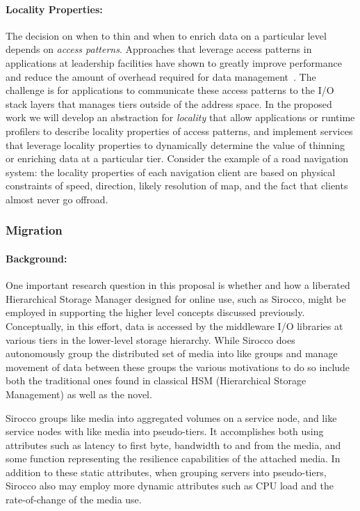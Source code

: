 \paragraph{Locality Properties:} The decision on when to thin and when to
enrich data on a particular level depends on \emph{access patterns}.
Approaches that leverage access patterns in applications at leadership facilities
 have shown to greatly improve performance and reduce the amount
of overhead required for data management~\cite{he:hpdc13}. The
challenge is for applications to communicate these access patterns
to the I/O stack layers that manages tiers outside of the address
space. In the proposed work we will develop an abstraction for
\emph{locality} that allow applications or runtime profilers to
describe locality properties of access patterns, and implement
services that leverage locality properties to dynamically determine
the value of thinning or enriching data at a particular tier.
Consider the example of a road navigation system: the locality
properties of each navigation client are based on physical constraints
of speed, direction, likely resolution of map, and the fact that
clients almost never go offroad.

\subsubsection{Migration}
\label{sec:migration}

\paragraph{Background:} One important research question in this proposal is
whether and how a liberated Hierarchical Storage Manager designed for online
use, such as Sirocco, might be employed in supporting the higher level
concepts discussed previously. Conceptually, in this effort, data is
accessed by the middleware I/O libraries at various tiers in the lower-level
storage hierarchy. While Sirocco does autonomously group the distributed set
of media into like groups and manage movement of data between these groups
the various motivations to do so include both the traditional ones found in
classical HSM (Hierarchical Storage Management) as well as the novel.

Sirocco groups like media into aggregated volumes on a service node, and like
service nodes with like media into pseudo-tiers. It accomplishes both using
attributes such as latency to first byte, bandwidth to and from the media, and
some function representing the resilience capabilities of the attached media.
In addition to these static attributes, when grouping servers into
pseudo-tiers, Sirocco also may employ more dynamic attributes such as CPU load
and the rate-of-change of the media use.

